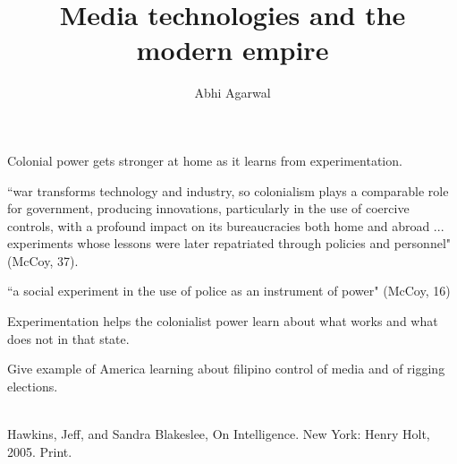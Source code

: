 \documentclass[12pt, oneside]{article}
\title{Media technologies and the modern empire\vspace{-0.4cm}}
\author{Abhi Agarwal\vspace{-1cm}}
\date{}
\begin{document}
\maketitle





\par Colonial power gets stronger at home as it learns from experimentation.
\par ``war transforms technology and industry, so colonialism plays a comparable role for government, producing innovations, particularly in the use of coercive controls, with a profound impact on its bureaucracies both home and abroad ... experiments whose lessons were later repatriated through policies and personnel" (McCoy, 37).
\par ``a social experiment in the use of police as an instrument of power" (McCoy, 16)

\par Experimentation helps the colonialist power learn about what works and what does not in that state.
\par Give example of America learning about filipino control of media and of rigging elections.


\noindent

\begin{workscited}
\bibent \\
\bibent Hawkins, Jeff, and Sandra Blakeslee, On Intelligence. New York: Henry Holt, 2005. Print. \\
\end{workscited}
\end{document}
